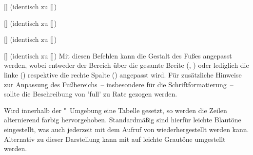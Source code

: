 \begin{DeclareEntity}{}
\begin{Declaration}
  {[]}
  (identisch zu [])
\begin{Declaration}
  {[]}
  (identisch zu [])
\begin{Declaration}
  {[]}
  (identisch zu [\OPValue{*}])
\begin{Declaration}
  {[]}
  (identisch zu [\MPValue{*}])
\printdeclarationlist
%
Mit diesen Befehlen kann die Gestalt des Fußes angepasst werden, wobei entweder 
der Bereich über die gesamte Breite (, ) 
oder lediglich die linke () respektive die rechte Spalte 
() angepasst wird. Für zusätzliche Hinweise zur Anpassung 
des Fußbereichs~-- insbesondere für die Schriftformatierung~-- sollte die 
Beschreibung von 'full' zu Rate gezogen werden.
\end{Declaration}
\end{Declaration}
\end{Declaration}
\end{Declaration}

\begin{Declaration}
  {}
\begin{Declaration}
  {}
\begin{Declaration}
  {}
\printdeclarationlist
%
Wird innerhalb der "~Umgebung eine Tabelle gesetzt, 
so werden die Zeilen alternierend farbig hervorgehoben. Standardmäßig sind 
hierfür leichte Blautöne eingestellt, was auch jederzeit mit dem Aufruf von 
 wiederhergestellt werden kann. Alternativ zu dieser 
Darstellung kann mit  auf leichte Grautöne umgestellt werden.
\end{Declaration}
\end{Declaration}
\end{Declaration}


\end{DeclareEntity}
